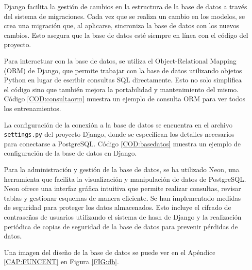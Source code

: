 Django facilita la gestión de cambios en la estructura de la base de datos a través del sistema de migraciones. Cada vez que se realiza un cambio en los modelos, se crea una migración que, al aplicarse, sincroniza la base de datos con los nuevos cambios. Esto asegura que la base de datos esté siempre en línea con el código del proyecto.

Para interactuar con la base de datos, se utiliza el Object-Relational Mapping (ORM) de Django, que permite trabajar con la base de datos utilizando objetos Python en lugar de escribir consultas SQL directamente. Esto no solo simplifica el código sino que también mejora la portabilidad y mantenimiento del mismo. Código \ref{COD:consultaorm} muestra un ejemplo de consulta ORM para ver todos los entrenamientos.

La configuración de la conexión a la base de datos se encuentra en el archivo \texttt{settings.py} del proyecto Django, donde se especifican los detalles necesarios para conectarse a PostgreSQL. Código \ref{COD:basedatos} muestra un ejemplo de configuración de la base de datos en Django.

Para la administración y gestión de la base de datos, se ha utilizado Neon, una herramienta que facilita la visualización y manipulación de datos de PostgreSQL. Neon ofrece una interfaz gráfica intuitiva que permite realizar consultas, revisar tablas y gestionar esquemas de manera eficiente.
Se han implementado medidas de seguridad para proteger los datos almacenados. Esto incluye el cifrado de contraseñas de usuarios utilizando el sistema de hash de Django y la realización periódica de copias de seguridad de la base de datos para prevenir pérdidas de datos.

Una imagen del diseño de la base de datos se puede ver en el Apéndice \ref{CAP:FUNCENT} en Figura \ref{FIG:db}.